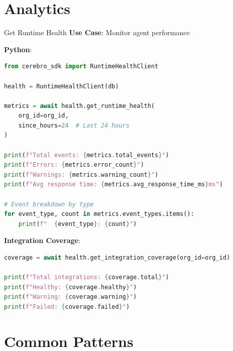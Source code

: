 \documentclass[aspectratio=169]{beamer}
\begin{document}
\section{Analytics}

\begin{frame}[fragile]{Get Runtime Health}
\textbf{Use Case}: Monitor agent performance

\textbf{Python}:
\begin{lstlisting}[language=Python]
from cerebro_sdk import RuntimeHealthClient

health = RuntimeHealthClient(db)

metrics = await health.get_runtime_health(
    org_id=org_id,
    since_hours=24  # Last 24 hours
)

print(f"Total events: {metrics.total_events}")
print(f"Errors: {metrics.error_count}")
print(f"Warnings: {metrics.warning_count}")
print(f"Avg response time: {metrics.avg_response_time_ms}ms")

# Event breakdown by type
for event_type, count in metrics.event_types.items():
    print(f"  {event_type}: {count}")
\end{lstlisting}

\textbf{Integration Coverage}:
\begin{lstlisting}[language=Python]
coverage = await health.get_integration_coverage(org_id=org_id)

print(f"Total integrations: {coverage.total}")
print(f"Healthy: {coverage.healthy}")
print(f"Warning: {coverage.warning}")
print(f"Failed: {coverage.failed}")
\end{lstlisting}
\end{frame}

\section{Common Patterns}
\end{document}
